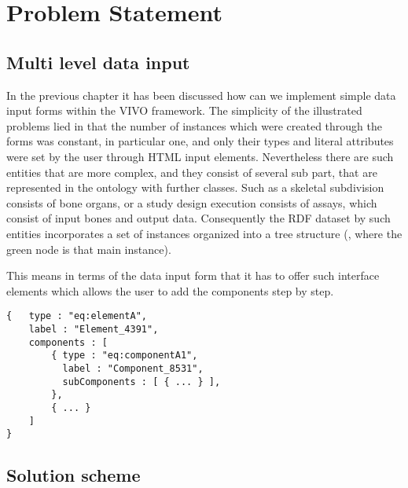 \chapter{Problem Statement}


\section{Multi level data input}


In the previous chapter it has been discussed how can we implement simple data input forms within the VIVO framework. The simplicity of the illustrated problems lied in that the number of instances which were created through the forms was constant, in particular one, and only their types and literal attributes were set by the user through HTML input elements. Nevertheless there are such entities that are more complex, and they consist of several sub part, that are represented in the ontology with further classes. Such as a skeletal subdivision consists of bone organs, or a study design execution consists of assays, which consist of input bones and output data. Consequently the RDF dataset by such entities incorporates a set of instances organized into a tree structure (, where the green node is that main instance). 



This means in terms of the data input form that it has to offer such interface elements which allows the user to add the components step by step. 










\begin{lstlisting}[basicstyle=\footnotesize, frame=single, caption={Multi level form data in JSON}, label=multiData, captionpos=b, belowskip=1em, aboveskip=2em]
{	type : "eq:elementA",
	label : "Element_4391",
	components : [
		{ type : "eq:componentA1",
		  label : "Component_8531",	
		  subComponents : [ { ... } ],
		},
		{ ... }
	]
}
\end{lstlisting}




\section{Solution scheme}

